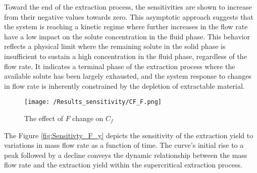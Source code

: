 \documentclass[../Article_Sensitivity_Analsysis.tex]{subfiles}
\begin{document}
    Toward the end of the extraction process, the sensitivities are shown to increase from their negative values towards zero. This asymptotic approach suggests that the system is reaching a kinetic regime where further increases in the flow rate have a low impact on the solute concentration in the fluid phase. This behavior reflects a physical limit where the remaining solute in the solid phase is insufficient to sustain a high concentration in the fluid phase, regardless of the flow rate. It indicates a terminal phase of the extraction process where the available solute has been largely exhausted, and the system response to changes in flow rate is inherently constrained by the depletion of extractable material.
    
    
    \begin{figure}[h!]
    	\centering
    	\texttt{[image: /Results\_sensitivity/CF\_F.png]}
    	\caption{The effect of $F$ change on $C_f$}
    	\label{fig:Sensitivty_F_CF}
    \end{figure}

	
	The Figure \ref{fig:Sensitivty_F_y} depicts the sensitivity of the extraction yield to variations in mass flow rate  as a function of time. The curve’s initial rise to a peak followed by a decline conveys the dynamic relationship between the mass flow rate and the extraction yield within the supercritical extraction process.
	
\end{document}
